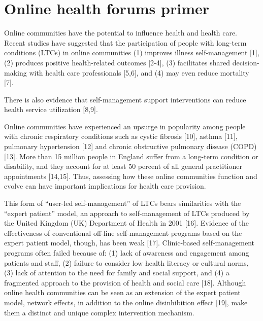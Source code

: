 
\chapter{Online health forums primer}
Online communities have the potential to influence health and health care. Recent studies have suggested that the participation of people with long-term conditions (LTCs) in online communities (1) improves illness self-management [1], (2) produces positive health-related outcomes [2-4], (3) facilitates shared decision-making with health care professionals [5,6], and (4) may even reduce mortality [7].

There is also evidence that self-management support interventions can reduce health service utilization [8,9].

Online communities have experienced an upsurge in popularity among people with chronic respiratory conditions such as cystic fibrosis [10], asthma [11], pulmonary hypertension [12] and chronic obstructive pulmonary disease (COPD) [13]. More than 15 million people in England suffer from a long-term condition or disability, and they account for at least 50 percent of all general practitioner appointments [14,15]. Thus, assessing how these online communities function and evolve can have important implications for health care provision.

This form of “user-led self-management” of LTCs bears similarities with the “expert patient” model, an approach to self-management of LTCs produced by the United Kingdom (UK) Department of Health in 2001 [16]. Evidence of the effectiveness of conventional off-line self-management programs based on the expert patient model, though, has been weak [17]. Clinic-based self-management programs often failed because of: (1) lack of awareness and engagement among patients and staff, (2) failure to consider low health literacy or cultural norms, (3) lack of attention to the need for family and social support, and (4) a fragmented approach to the provision of health and social care [18]. Although online health communities can be seen as an extension of the expert patient model, network effects, in addition to the online disinhibition effect [19], make them a distinct and unique complex intervention mechanism.


